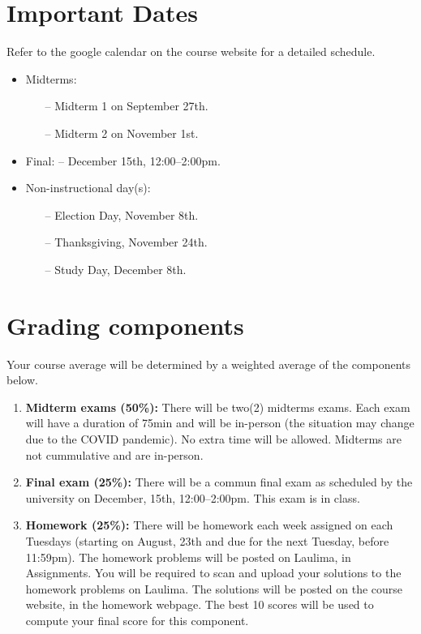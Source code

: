 \documentclass[12pt]{amsart}
\begin{document}
\section*{Important Dates}
Refer to the google calendar on the course website for a detailed schedule.
	\begin{itemize}
	\item Midterms:
		\begin{itemize}
		\item[--] Midterm 1 on September 27th.
		\item[--] Midterm 2 on November 1st.
		\end{itemize}
	\item Final: -- December 15th, 12:00--2:00pm.
	\item Non-instructional day(s):
		\begin{itemize}
		\item[--] Election Day, November 8th.
		\item[--] Thanksgiving, November 24th.
		\item[--] Study Day, December 8th.
		\end{itemize}
	\end{itemize}

\section*{Grading components}
Your course average will be determined by a weighted average of the components below.

\begin{enumerate}
\item {\bf Midterm exams (50\%):} There will be two(2) midterms exams. Each exam will have a duration of 75min and will be in-person (the situation may change due to the COVID pandemic). No extra time will be allowed. Midterms are not cummulative and are in-person. 
\item {\bf Final exam (25\%):} There will be a commun final exam as scheduled by the university on December, 15th, 12:00--2:00pm. This exam is in class.
\item{\bf Homework (25\%):} There will be homework each week assigned on each Tuesdays (starting on August, 23th and due for the next Tuesday, before 11:59pm). The homework problems will be posted on Laulima, in Assignments. You will be required to scan and upload your solutions to the homework problems on Laulima. The solutions will be posted on the course website, in the homework webpage. The best 10 scores will be used to compute your final score for this component.%
\end{enumerate}
\end{document}
